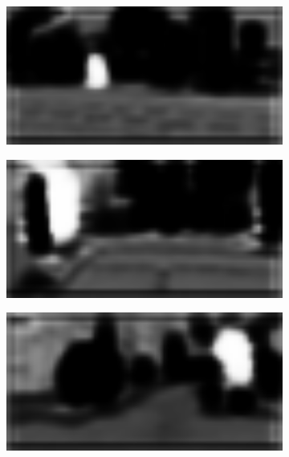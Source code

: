 \begin{figure}[b]
	\centering
	\begin{subfigure}{.5\textwidth}
		\centering
		\includegraphics[width=1\textwidth]{Sources/Results/pooling/novelty_maps/novelty_map_1.png}
	\end{subfigure}%
	\begin{subfigure}{.5\textwidth}
		\centering
		\includegraphics[width=1\textwidth]{Sources/Results/pooling/novelty_maps/novelty_map_2.png}
	\end{subfigure}
	\begin{subfigure}{.5\textwidth}
		\centering
		\includegraphics[width=1\textwidth]{Sources/Results/pooling/novelty_maps/novelty_map_3.png}

\end{subfigure}
\end{figure}
